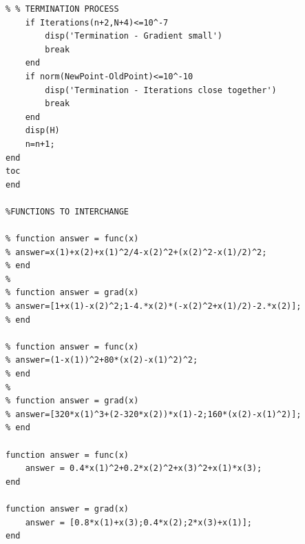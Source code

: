 \documentclass[10pt,a4paper,notitlepage]{article}
\begin{document}
\begin{verbatim}
% % TERMINATION PROCESS
    if Iterations(n+2,N+4)<=10^-7
        disp('Termination - Gradient small')
        break
    end
    if norm(NewPoint-OldPoint)<=10^-10
        disp('Termination - Iterations close together')
        break
    end
    disp(H)
    n=n+1;
end
toc
end

%FUNCTIONS TO INTERCHANGE

% function answer = func(x)
% answer=x(1)+x(2)+x(1)^2/4-x(2)^2+(x(2)^2-x(1)/2)^2;
% end
% 
% function answer = grad(x)
% answer=[1+x(1)-x(2)^2;1-4.*x(2)*(-x(2)^2+x(1)/2)-2.*x(2)];
% end

% function answer = func(x)
% answer=(1-x(1))^2+80*(x(2)-x(1)^2)^2;
% end
% 
% function answer = grad(x)
% answer=[320*x(1)^3+(2-320*x(2))*x(1)-2;160*(x(2)-x(1)^2)];
% end

function answer = func(x)
    answer = 0.4*x(1)^2+0.2*x(2)^2+x(3)^2+x(1)*x(3);
end

function answer = grad(x)
    answer = [0.8*x(1)+x(3);0.4*x(2);2*x(3)+x(1)];
end
\end{verbatim}
\pagebreak
\end{document}
